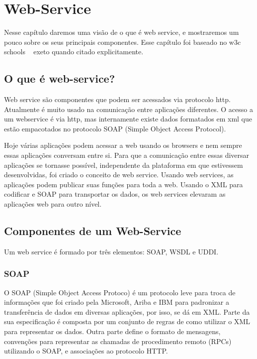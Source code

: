 \chapter{Web-Service}


Nesse capítulo daremos uma visão de o que é web service, e mostraremos um pouco sobre os seus principais componentes. Esse capítulo foi baseado no w3c schools ~\cite{msdn} exeto quando citado explicitamente.

\section{O que é web-service?}

Web service são componentes que podem ser acessados via protocolo http. Atualmente é muito usado na comunicação entre aplicações diferentes. O acesso a um webservice é via http, mas internamente existe dados formatados em xml que estão empacotados no protocolo SOAP (Simple Object Access Protocol).

Hoje várias aplicações podem acessar a web usando os browsers e nem sempre essas aplicações conversam entre si. Para que a comunicação entre essas diversar aplicações se tornasse possível, independente da plataforma em que estivessem desenvolvidas, foi criado o conceito de web service. Usando web services, as aplicações podem publicar suas funções para toda a web. Usando o XML para codificar e SOAP para transportar os dados, os web services elevaram as aplicações web para outro nível.

\section{Componentes de um Web-Service}

Um web service é formado por três elementos: SOAP, WSDL e UDDI.

\subsection{SOAP}


O SOAP (Simple Object Access Protoco) é um protocolo leve para troca de informações que foi criado pela Microsoft, Ariba e IBM para padronizar a transferência de dados em diversas aplicações, por isso, se dá em XML. Parte da sua especificação é composta por um conjunto de regras de como utilizar o XML para representar os dados. Outra parte define o formato de mensagens, convenções para representar as chamadas de procedimento remoto (RPCs) utilizando o SOAP, e associações ao protocolo HTTP. 

